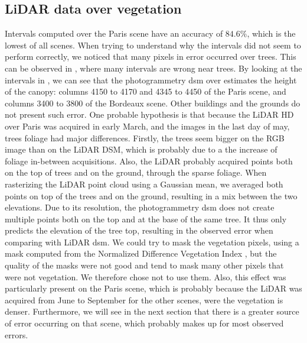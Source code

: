 \subsection{LiDAR data over vegetation}\label{eq:lidar_vegetation}
Intervals computed over the Paris scene have an accuracy of $84.6\%$, which is the lowest of all scenes. When trying to understand why the intervals did not seem to perform correctly, we noticed that many pixels in error occurred over trees. This can be observed in , where many intervals are wrong near trees. By looking at the intervals in , we can see that the photogrammetry \acrshort{dsm} over estimates the height of the canopy: columns 4150 to 4170 and 4345 to 4450 of the Paris scene, and columns 3400 to 3800 of the Bordeaux scene. Other buildings and the grounds do not present such error. One probable hypothesis is that because the LiDAR HD over Paris was acquired in early March, and the images in the last day of may, trees foliage had major differences. Firstly, the trees seem bigger on the RGB image than on the LiDAR DSM, which is probably due to a the increase of foliage in-between acquisitions. Also, the LiDAR probably acquired points both on the top of trees and on the ground, through the sparse foliage. When rasterizing the LiDAR point cloud using a Gaussian mean, we averaged both points on top of the trees and on the ground, resulting in a mix between the two elevations. Due to its resolution, the photogrammetry \acrshort{dsm} does not create multiple points both on the top and at the base of the same tree. It thus only predicts the elevation of the tree top, resulting in the observed error when comparing with LiDAR \acrshort{dsm}. We could try to mask the vegetation pixels, using a mask computed from the Normalized Difference Vegetation Index \cite{gao_ndwinormalized_1996}, but the quality of the masks were not good and tend to mask many other pixels that were not vegetation. We therefore chose not to use them. Also, this effect was particularly present on the Paris scene, which is probably because the LiDAR was acquired from June to September for the other scenes, were the vegetation is denser. Furthermore, we will see in the next section that there is a greater source of error occurring on that scene, which probably makes up for most observed errors. 

